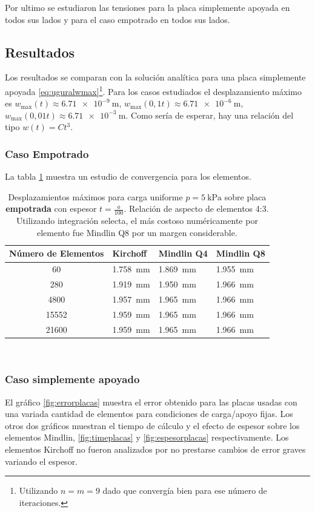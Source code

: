 \documentclass[onecolumn,10pt,titlepage]{article}
\begin{document}
Por ultimo se estudiaron las tensiones para la placa simplemente apoyada en todos sus lados y para el caso empotrado en todos sus lados.

\subsection{Resultados}
Los resultados se comparan con la solución analítica para una placa simplemente apoyada \eqref{eq:uguralwmax}\footnote{Utilizando $n=m=9$ dado que convergía bien para ese número de iteraciones.}. Para los casos estudiados el desplazamiento máximo es $w_{\max}(t)\approx \SI{6,71e-9}{\meter}$, $w_{\max}(0,1t)\approx \SI{6,71e-6}{\meter}$, $w_{\max}(0,01t)\approx \SI{6,71e-3}{\meter}$. Como sería de esperar, hay una relación del tipo $w(t)=Ct^3$.
\subsubsection*{Caso Empotrado}
La tabla \ref{tab:Convergencia} muestra un estudio de convergencia para los elementos. 
\begin{table}[htb!] 
	\centering
	\begin{tabular}{clll}
		Número de Elementos& Kirchoff & Mindlin Q4 & Mindlin Q8  \\ \hline
		60  & \SI{1,758}{\milli \meter}  &  \SI{1,869}{\milli \meter}  & \SI{1,955}{\milli \meter} \\
		280  & \SI{1,919}{\milli \meter}  &  \SI{1,950}{\milli \meter}  & \SI{1,966}{\milli \meter} \\
		4800 &\SI{1,957}{\milli \meter}  &   \SI{1,965}{\milli \meter} &\SI{1,966}{\milli \meter} \\
		15552 &  \SI{1,959}{\milli \meter}   &  \SI{1,965}{\milli \meter}  & \SI{1,966}{\milli \meter}\\
		21600&  \SI{1,959}{\milli \meter}& \SI{1,965}{\milli \meter}  & \SI{1,966}{\milli \meter}
	\end{tabular}\
	\caption{Desplazamientos máximos para carga uniforme $p=\SI{5}{\kilo \pascal}$ sobre placa \textbf{empotrada} con espesor $t=\frac{a}{100}$. Relación de aspecto de elementos 4:3. Utilizando integración selecta\citep{cook2007concepts}, el más costoso numéricamente por elemento fue Mindlin Q8 por un margen considerable.}
	\label{tab:Convergencia}
\end{table}

\subsubsection*{Caso simplemente apoyado}
El gráfico \ref{fig:errorplacas} muestra el error obtenido para las placas usadas con una variada cantidad de elementos para condiciones de carga/apoyo fijas. Los otros dos gráficos muestran el tiempo de cálculo y el efecto de espesor sobre los elementos Mindlin, \ref{fig:timeplacas} y \ref{fig:espesorplacas} respectivamente. Los elementos Kirchoff no fueron analizados por no prestarse cambios de error graves variando el espesor.
\end{document}
